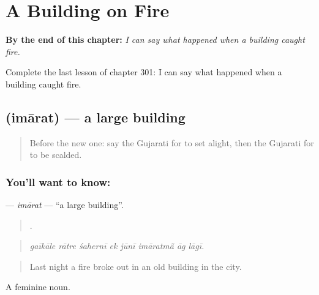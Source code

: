 
\chapter{A Building on Fire}
\label{ch:gu-a-building-on-fire}

\begin{chapteropening}
\textbf{By the end of this chapter:} \emph{I can say what happened when a building caught fire.}

Complete the last lesson of chapter 301: I can say what happened when a building caught fire.
\end{chapteropening}

\section[\texorpdfstring{\gu{ઇમારત} (imārat)}{ઇમારત (imārat)}]{ (imārat) — a large building}

\label{lesson:GU-C301-imarat}



\begin{quote}
Before the new one: say the Gujarati for to set alight, then the Gujarati for to be scalded.
\end{quote}

\subsection*{You'll want to know: }
\textbf{} — \emph{imārat} — \textquotedblleft{}a large building\textquotedblright{}.

\begin{quote}
       .
\end{quote}

\begin{quote}
\emph{gaīkāle rātre śahernī ek jūnī imāratmā̃ āg lāgī.}
\end{quote}

\begin{quote}
Last night a fire broke out in an old building in the city.
\end{quote}

A feminine noun.

